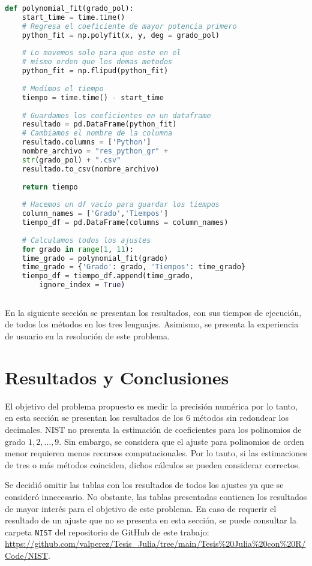 \begin{lstlisting}[language=Python]
def polynomial_fit(grado_pol):
	start_time = time.time()
	# Regresa el coeficiente de mayor potencia primero
	python_fit = np.polyfit(x, y, deg = grado_pol)
	
	# Lo movemos solo para que este en el 
	# mismo orden que los demas metodos
	python_fit = np.flipud(python_fit)
	
	# Medimos el tiempo
	tiempo = time.time() - start_time
	
	# Guardamos los coeficientes en un dataframe
	resultado = pd.DataFrame(python_fit)
	# Cambiamos el nombre de la columna
	resultado.columns = ['Python']
	nombre_archivo = "res_python_gr" + 
	str(grado_pol) + ".csv"
	resultado.to_csv(nombre_archivo)
	
	return tiempo
	
	# Hacemos un df vacio para guardar los tiempos
	column_names = ['Grado','Tiempos']
	tiempo_df = pd.DataFrame(columns = column_names)
	
	# Calculamos todos los ajustes
	for grado in range(1, 11):
	time_grado = polynomial_fit(grado)
	time_grado = {'Grado': grado, 'Tiempos': time_grado}
	tiempo_df = tiempo_df.append(time_grado, 
		ignore_index = True)
	
\end{lstlisting}

En la siguiente sección se presentan los resultados, con sus tiempos de ejecución, de todos los métodos en los tres lenguajes. Asimismo, se presenta la experiencia de usuario en la resolución de este problema. 

\section{Resultados y Conclusiones} \label{sec_evalMetodos}

El objetivo del problema propuesto es medir la precisión numérica por lo tanto, en esta sección se presentan los resultados de los 6 métodos sin redondear los decimales. NIST no presenta la estimación de coeficientes para los polinomios de grado $1, 2, \dots, 9$. Sin embargo, se considera que el ajuste para polinomios de orden menor requieren menos recursos computacionales. Por lo tanto, si las estimaciones de tres o más métodos coinciden, dichos cálculos se pueden considerar correctos. 

Se decidió omitir las tablas con los resultados de todos los ajustes ya que se consideró innecesario. No obstante, las tablas presentadas contienen los resultados de mayor interés para el objetivo de este problema. En caso de requerir el resultado de un ajuste que no se presenta en esta sección, se puede consultar la carpeta \texttt{NIST} del repositorio de GitHub de este trabajo: \url{https://github.com/valperez/Tesis_Julia/tree/main/Tesis%20Julia%20con%20R/Code/NIST}. 

